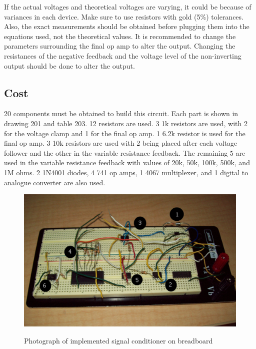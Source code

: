 If the actual voltages and theoretical voltages are varying, it could be 
because of variances in each device. Make sure to use resistors with gold (5\%)
 tolerances. Also, the exact measurements should be obtained before plugging
 them into the equations used, not the theoretical values.
	It is recommended to change the parameters surrounding the final op amp to 
alter the output. Changing the resistances of the negative feedback and the
 voltage level of the non-inverting output should be done to alter the output.

\subsection{Cost}
20 components must be obtained to build this circuit. Each part is shown in 
drawing 201 and table 203. 12 resistors are used. 3 1k resistors are used,
 with 2 for the voltage clamp and 1 for the final op amp. 1 6.2k resistor is
 used for the final op amp. 3 10k resistors are used with 2 being placed after
 each voltage follower and the other in the variable resistance feedback. The 
remaining 5 are used in the variable resistance feedback with values of 20k,
 50k, 100k, 500k, and 1M ohms.
	2 1N4001 diodes, 4 741 op amps, 1 4067 multiplexer, and 1 digital to
 analogue converter are also used.

\begin{figure}[hbp]
\caption{Photograph of implemented signal conditioner on breadboard}
\includegraphics[width=5in]{sub_analog_hw.jpg}
\label{fig:analog breadboard}
\end{figure}

